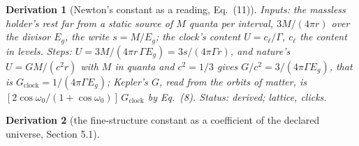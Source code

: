 \documentclass[pdflatex,sn-mathphys-num]{sn-jnl}
\theoremstyle{thmstyleone}
\newtheorem{derivation}{Derivation}
\begin{document}
\begin{derivation}[Newton's constant as a reading, Eq.~(11)]
\emph{Inputs:} the massless holder's rest far from a static source of $M$ quanta per interval, $3M / (4\pi r)$ over the divisor $E_g$, the write $s = M / E_g$; the clock's content $U = c_\ell / \Gamma$, $c_\ell$ the content in levels. \emph{Steps:} $U = 3M / (4\pi r\,\Gamma E_g) = 3s / (4\pi\Gamma r)$, and nature's $U = GM / (c^2 r)$ with $M$ in quanta and $c^2 = 1 / 3$ gives $G / c^2 = 3 / (4\pi\Gamma E_g)$, that is $G_{\mathrm{clock}} = 1 / (4\pi\Gamma E_g)$; Kepler's $G$, read from the orbits of matter, is $[2\cos\omega_0 / (1 + \cos\omega_0)]\,G_{\mathrm{clock}}$ by Eq.~(8).
 \emph{Status:} derived; lattice, clicks.
\end{derivation}

\begin{derivation}[the fine-structure constant as a coefficient of the declared universe, Section 5.1]

\end{derivation}
\end{document}
